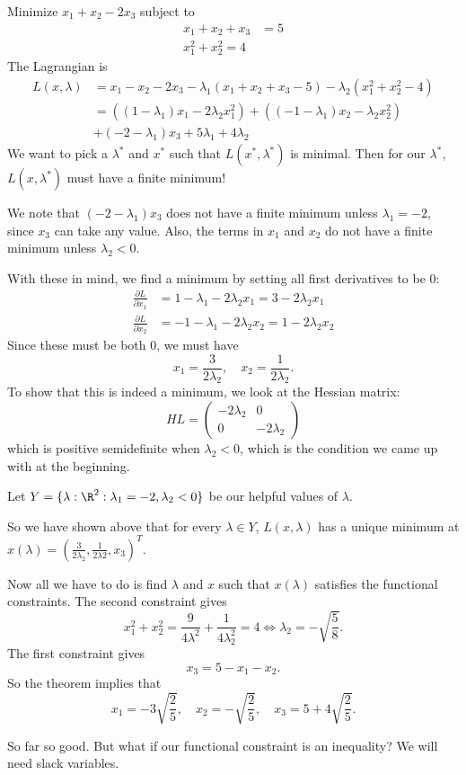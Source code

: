 \documentclass[a4paper]{article}
\begin{document}
\begin{eg}
  Minimize $x_1 + x_2 - 2x_3$ subject to
  \begin{align*}
    x_1 + x_2 + x_3 &= 5\\
    x_1^2 + x_2^2 = 4
  \end{align*}
  The Lagrangian is
  \begin{align*}
    L(x, \lambda) &= x_1 - x_2 - 2x_3 - \lambda_1(x_1 + x_2 + x_3 - 5) - \lambda_2 (x_1^2 + x_2^2 - 4)\\
    &= ((1 - \lambda_1)x_1 - 2\lambda_2 x_1^2) + ((-1 - \lambda_1)x_2 - \lambda_2 x_2^2) \\
    &+ (-2 - \lambda_1)x_3 + 5\lambda_1 + 4\lambda_2
  \end{align*}
  We want to pick a $\lambda^*$ and $x^*$ such that $L(x^*, \lambda^*)$ is minimal. Then for our $\lambda^*$, $L(x, \lambda^*)$  must have a finite minimum!

  We note that $(-2 - \lambda_1)x_3$ does not have a finite minimum unless $\lambda_1 = -2$, since $x_3$ can take any value. Also, the terms in $x_1$ and $x_2$ do not have a finite minimum unless $\lambda_2 < 0$.

  With these in mind, we find a minimum by setting all first derivatives to be $0$:
  \begin{align*}
    \frac{\partial L}{\partial x_1} &= 1 - \lambda_1 - 2\lambda_2 x_1 = 3 - 2\lambda_2x_1\\
    \frac{\partial L}{\partial x_2} &= -1 - \lambda_1 - 2\lambda_2 x_2 = 1 - 2\lambda_2 x_2
  \end{align*}
  Since these must be both $0$, we must have
  \[
    x_1 = \frac{3}{2\lambda_2}, \quad x_2 = \frac{1}{2\lambda_2}.
  \]
  To show that this is indeed a minimum, we look at the Hessian matrix:
  \[
    HL =
    \begin{pmatrix}
      -2\lambda_2 & 0\\
      0 & -2\lambda_2
    \end{pmatrix}
  \]
  which is positive semidefinite when $\lambda_2 < 0$, which is the condition we came up with at the beginning.

  Let $Y = \{\lambda: \R^2: \lambda_1 = -2, \lambda_2 < 0\}$ be our helpful values of $\lambda$.

  So we have shown above that for every $\lambda \in Y$, $L(x, \lambda)$ has a unique minimum at $x(\lambda) = (\frac{3}{2\lambda_2}, \frac{1}{2\lambda2}, x_3)^T$.

  Now all we have to do is find $\lambda$ and $x$ such that $x(\lambda)$ satisfies the functional constraints. The second constraint gives
  \[
    x_1^2 + x_2^2 = \frac{9}{4\lambda^2} + \frac{1}{4\lambda_2^2} = 4 \Leftrightarrow \lambda_2 = -\sqrt{\frac{5}{8}}.
  \]
  The first constraint gives
  \[
    x_3 = 5 - x_1 - x_2.
  \]
  So the theorem implies that
  \[
    x_1 = -3\sqrt{\frac{2}{5}},\quad x_2 = -\sqrt{\frac{2}{5}},\quad x_3 = 5 + 4\sqrt{\frac{2}{5}}.
  \]
\end{eg}
So far so good. But what if our functional constraint is an inequality? We will need slack variables.
\end{document}
